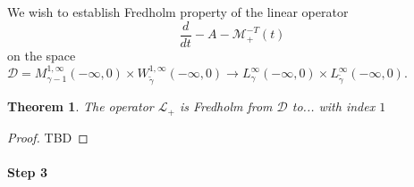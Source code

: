 \documentclass[letterpaper,11pt]{article}
\numberwithin{equation}{section}
\theoremstyle{plain}
\newtheorem{theorem}{Theorem}[section]
\begin{document}
We wish to establish Fredholm property of the linear operator
\[
\dfrac{d}{dt} - A - \mathcal{M}_+^{-T}(t)
\]
on the space $\mathcal{D} = M_{\gamma-1}^{1,\infty} (-\infty,0) \times W_{\tilde{\gamma}}^{1,\infty}(-\infty,0) \to L_{\gamma}^{\infty}(-\infty,0) \times L_{\tilde{\gamma}}^{\infty}(-\infty,0)$.

\begin{theorem}
The operator $\mathcal{L}_+$ is Fredholm from $\mathcal{D}$ to... with index $1$
\end{theorem}


\begin{proof}
TBD
\end{proof}



\paragraph{Step 3}
\end{document}
